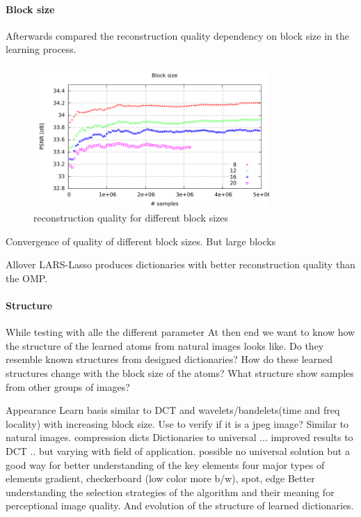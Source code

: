 \paragraph{Block size}
Afterwards compared the reconstruction quality dependency on block size in the
learning process.

\begin{figure}[h]
\centering
\includegraphics[width =
0.8\textwidth]{../tests/results/blockSizeConverg.pdf}
\caption{reconstruction quality for different block sizes}
\label{fig:dict size}
\end{figure}

Convergence of quality of different block sizes.
But large blocks 

Allover LARS-Lasso produces dictionaries with better reconstruction quality
than the OMP. 

\paragraph{Structure}
While testing with alle the different parameter
At then end we want to know how the structure of the learned atoms from natural
images looks like. Do they resemble known structures from designed dictionaries?
How do these learned structures change with the block size of the atoms?
What structure show samples from other groups of images?

Appearance 
Learn basis similar to DCT and wavelets/bandelets(time and freq locality) with
increasing block size. Use to verify if it is a jpeg image?
Similar to natural images.
compression dicts
Dictionaries to universal ... improved results to DCT .. but varying with field
of application. possible no universal solution but a good way for better
understanding of the key elements
  four major types of elements
  gradient, checkerboard (low color more b/w), spot, edge
Better understanding the selection strategies of the algorithm and their
meaning for perceptional image quality. And evolution of the structure of
learned dictionaries. 

